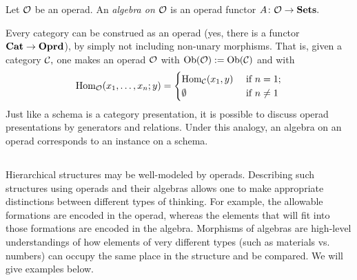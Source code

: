 \documentclass[CT4S-EN-RU]{subfiles}
\begin{document}
\begin{exerciseRUS}
\end{exerciseRUS}

\begin{definitionENG}\label{def:operad algebra}
Let $\mathcal{O}$ be an operad. An {\em algebra on $\mathcal{O}$} is an operad functor $A\colon\mathcal{O}\rightarrow{\mathbf{Sets}}.$
\end{definitionENG}

\begin{definitionRUS}\label{def:operad algebra}
\end{definitionRUS}

\begin{remarkENG}
Every category can be construed as an operad (yes, there is a functor ${\mathbf{Cat}}\rightarrow{\mathbf{Oprd}}$), by simply not including non-unary morphisms. That is, given a category $\mathcal{C},$ one makes an operad $\mathcal{O}$ with $\textnormal{Ob}(\mathcal{O}):=\textnormal{Ob}(\mathcal{C})$ and with 
$$
\textnormal{Hom}_\mathcal{O}(x_1,\ldots,x_n;y)=
\begin{cases}
\textnormal{Hom}_\mathcal{C}(x_1,y)&\textnormal{ if }n=1;\\
\emptyset&\textnormal{ if }n\neq 1
\end{cases}
$$
Just like a schema is a category presentation, it is possible to discuss operad presentations by generators and relations. Under this analogy, an algebra on an operad corresponds to an instance on a schema.
\end{remarkENG}

\begin{remarkRUS}
\end{remarkRUS}


\subsection{}

\begin{blockENG}
Hierarchical structures may be well-modeled by operads. Describing such structures using operads and their algebras allows one to make appropriate distinctions between different types of thinking. For example, the allowable formations are encoded in the operad, whereas the elements that will fit into those formations are encoded in the algebra. Morphisms of algebras are high-level understandings of how elements of very different types (such as materials vs. numbers) can occupy the same place in the structure and be compared. We will give examples below.
\end{blockENG}
\end{document}
